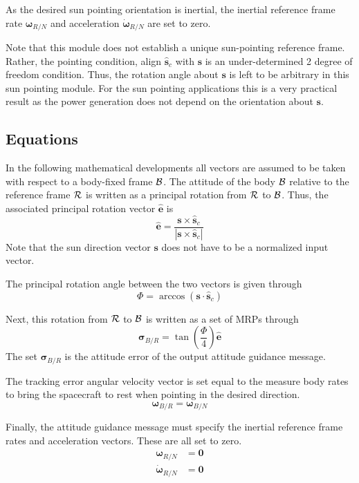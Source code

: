 As the desired sun pointing orientation is inertial, the inertial reference frame rate $\bm\omega_{R/N}$ and acceleration $\dot{\bm\omega}_{R/N}$ are set to zero. 

Note that this module does not establish a unique sun-pointing reference frame.  Rather, the pointing condition, align $\hat{\bm s}_{c}$ with $\bm s$ is an under-determined 2 degree of freedom condition.  Thus, the rotation angle about $\bm s$ is left to be arbitrary in this sun pointing module.  For the sun pointing applications this is a very practical result as the power generation does not depend on the orientation about $\bm s$.  



\subsection{Equations}
In the following mathematical developments all vectors are assumed to be taken with respect to a body-fixed frame $\cal B$.  The attitude of the body $\cal B$ relative to the reference frame $\cal R$ is written as a principal rotation from $\cal R$ to $\cal B$.  Thus, the associated principal rotation vector $\hat{\bm e}$ is
\begin{equation}
	\label{eq:ssp:1}
	\hat{\bm e} = \frac{\bm s \times \hat{\bm s}_{c}}{|\bm s \times \hat{\bm s}_{c}|}
\end{equation}
Note that the sun direction vector $\bm s$ does not have to be a normalized input vector.  

The principal rotation angle between the two vectors is given through
\begin{equation}
	\label{eq:ssp:2}
	\Phi = \arccos ( \bm s \cdot \hat{\bm s}_{c})
\end{equation}

Next, this rotation from $\cal R$ to $\cal B$ is written as a set of MRPs through
\begin{equation}
	\label{eq:ssp:3}
	\bm\sigma_{B/R} = \tan\left(\frac{\Phi}{4}\right) \hat{\bm e}
\end{equation}
The set $\bm\sigma_{B/R}$ is the attitude error of the output attitude guidance message.  


The tracking error angular velocity vector is set equal to the measure body rates to bring the spacecraft to rest when pointing in the desired direction.
\begin{equation}
	\label{eq:ssp:4}
	\bm\omega_{B/R} = \bm\omega_{B/N}
\end{equation}

Finally, the attitude guidance message must specify the inertial reference frame rates and acceleration vectors.  These are all set to zero.
\begin{align}
	\bm\omega_{R/N} &= \bm 0 \\
	\dot{\bm \omega}_{R/N} &= \bm 0
\end{align}
 